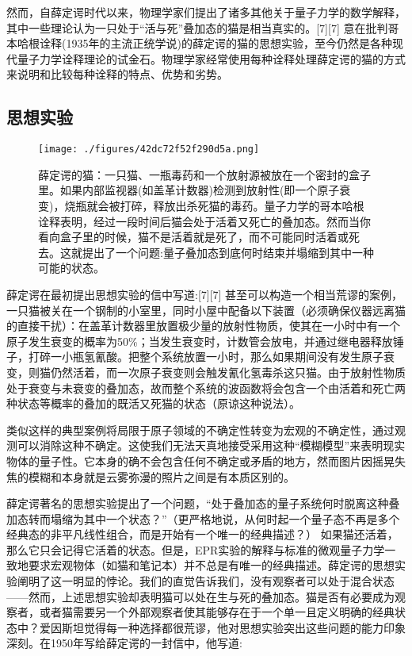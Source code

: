 然而，自薛定谔时代以来，物理学家们提出了诸多其他关于量子力学的数学解释，其中一些理论认为一只处于“活与死”叠加态的猫是相当真实的。[7][7] 意在批判哥本哈根诠释(1935年的主流正统学说)的薛定谔的猫的思想实验，至今仍然是各种现代量子力学诠释理论的试金石。物理学家经常使用每种诠释处理薛定谔的猫的方式来说明和比较每种诠释的特点、优势和劣势。

\subsection{思想实验}
\begin{figure}[ht]
\centering
\texttt{[image: ./figures/42dc72f52f290d5a.png]}
\caption{薛定谔的猫：一只猫、一瓶毒药和一个放射源被放在一个密封的盒子里。如果内部监视器(如盖革计数器)检测到放射性(即一个原子衰变)，烧瓶就会被打碎，释放出杀死猫的毒药。量子力学的哥本哈根诠释表明，经过一段时间后猫会处于活着又死亡的叠加态。然而当你看向盒子里的时候，猫不是活着就是死了，而不可能同时活着或死去。这就提出了一个问题:量子叠加态到底何时结束并塌缩到其中一种可能的状态。} \label{fig_XDEDM_3}
\end{figure}

薛定谔在最初提出思想实验的信中写道:[7][7]
甚至可以构造一个相当荒谬的案例，一只猫被关在一个钢制的小室里，同时小屋中配备以下装置（必须确保仪器远离猫的直接干扰）：在盖革计数器里放置极少量的放射性物质，使其在一小时中有一个原子发生衰变的概率为50\%；当发生衰变时，计数管会放电，并通过继电器释放锤子，打碎一小瓶氢氰酸。把整个系统放置一小时，那么如果期间没有发生原子衰变，则猫仍然活着，而一次原子衰变则会触发氰化氢毒杀这只猫。由于放射性物质处于衰变与未衰变的叠加态，故而整个系统的波函数将会包含一个由活着和死亡两种状态等概率的叠加的既活又死猫的状态（原谅这种说法）。

类似这样的典型案例将局限于原子领域的不确定性转变为宏观的不确定性，通过观测可以消除这种不确定。这使我们无法天真地接受采用这种“模糊模型”来表明现实物体的量子性。它本身的确不会包含任何不确定或矛盾的地方，然而图片因摇晃失焦的模糊和本身就是云雾弥漫的照片之间是有本质区别的。

薛定谔著名的思想实验提出了一个问题，“处于叠加态的量子系统何时脱离这种叠加态转而塌缩为其中一个状态？”（更严格地说，从何时起一个量子态不再是多个经典态的非平凡线性组合，而是开始有一个唯一的经典描述？） 如果猫还活着，那么它只会记得它活着的状态。但是，EPR实验的解释与标准的微观量子力学一致地要求宏观物体（如猫和笔记本）并不总是有唯一的经典描述。薛定谔的思想实验阐明了这一明显的悖论。我们的直觉告诉我们，没有观察者可以处于混合状态——然而，上述思想实验却表明猫可以处在生与死的叠加态。猫是否有必要成为观察者，或者猫需要另一个外部观察者使其能够存在于一个单一且定义明确的经典状态中？爱因斯坦觉得每一种选择都很荒谬，他对思想实验突出这些问题的能力印象深刻。在1950年写给薛定谔的一封信中，他写道:

